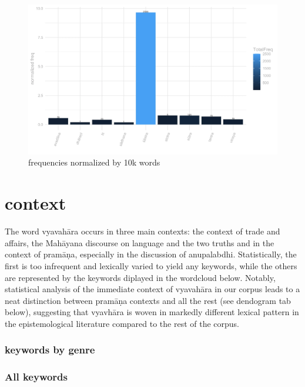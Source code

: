 \documentclass[
  letterpaper,
  DIV=11,
  numbers=noendperiod,
  oneside]{scrreprt}
\begin{document}
\begin{figure}

{\centering \includegraphics{./www/genresFreq_vyavahAra.webp}

}

\caption{\label{fig-freqbygenre}frequencies normalized by 10k words}

\end{figure}

\hypertarget{sec-context}{%
\section{context}\label{sec-context}}

The word vyavahāra occurs in three main contexts: the context of trade
and affairs, the Mahāyana discourse on language and the two truths and
in the context of pramāṇa, especially in the discussion of anupalabdhi.
Statistically, the first is too infrequent and lexically varied to yield
any keywords, while the others are represented by the keywords diplayed
in the wordcloud below. Notably, statistical analysis of the immediate
context of vyavahāra in our corpus leads to a neat distinction between
pramāṇa contexts and all the rest (see dendogram tab below), suggesting
that vyavhāra is woven in markedly different lexical pattern in the
epistemological literature compared to the rest of the corpus.

\hypertarget{keywords-by-genre}{%
\subsubsection{keywords by genre}\label{keywords-by-genre}}

\hypertarget{all-keywords}{%
\subsubsection{All keywords}\label{all-keywords}}
\end{document}
